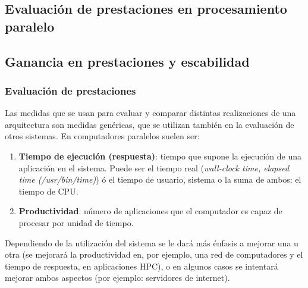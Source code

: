 \documentclass[10pt,a4paper,spanish]{report}
\begin{document}
\newpage
\textcolor[rgb]{0.2,0.4,0.8}{\section{Evaluación de prestaciones en procesamiento paralelo}}
\textcolor[rgb]{0.2,0.4,0.8}{\subsection{Ganancia en prestaciones y escabilidad}}
\textcolor[rgb]{0.2,0.4,0.8}{\subsubsection{Evaluación de prestaciones}}
Las medidas que se usan  para evaluar y comparar distintas realizaciones de una arquitectura son medidas genéricas, que se utilizan también en la evaluación de otros sistemas. En computadores paralelos suelen ser:
\begin{enumerate}[\color{azul}{\bf $\heartsuit$}]
    \item \textcolor[rgb]{0.2,0.4,0.8}{\textbf{Tiempo de ejecución (respuesta)}}: tiempo que supone la ejecución de una aplicación en el sistema. Puede ser el tiempo real (\textcolor[rgb]{0.2,0.4,0.8}{\textit{wall-clock time, elapsed time (/usr/bin/time)}}) ó el tiempo de usuario, sistema o la suma de ambos: el tiempo de CPU.
    \item \textcolor[rgb]{0.2,0.4,0.8}{\textbf{Productividad}}: número de aplicaciones que el computador es capaz de procesar por unidad de tiempo.
\end{enumerate}

Dependiendo de la utilización del sistema se le dará más énfasis a mejorar una u otra (se mejorará la productividad en, por ejemplo, una red de computadores y el tiempo de respuesta, en aplicaciones HPC), o en algunos casos se intentará mejorar ambos aspectos (por ejemplo: servidores de internet).
\end{document}
